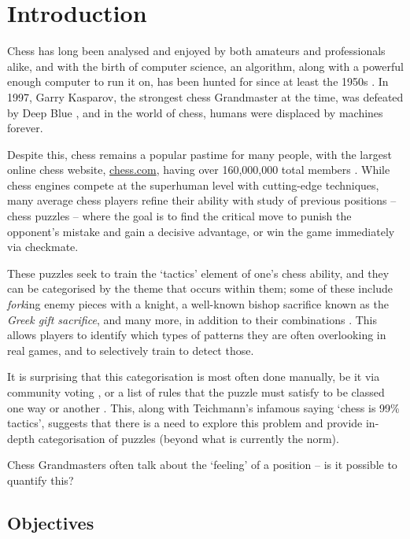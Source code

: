 \chapter{Introduction}

Chess has long been analysed and enjoyed by both amateurs and professionals
alike, and with the birth of computer science, an algorithm, along with a
powerful enough computer to run it on, has been hunted for since at least the
1950s \citep{shannon}. In 1997, Garry Kasparov, the strongest chess Grandmaster
at the time, was defeated by Deep Blue \citep{deepBlue}, and in the world of
chess, humans were displaced by machines forever. 

Despite this, chess remains a popular pastime for many people, with the largest
online chess website, \url{chess.com}, having over 160,000,000 total members
\citep{chesscomMembers}. While chess engines compete at the superhuman level
with cutting-edge techniques, many average chess players refine their ability
with study of previous positions -- chess puzzles -- where the goal is to find
the critical move to punish the opponent's mistake and gain a decisive
advantage, or win the game immediately via checkmate. 

These puzzles seek to train the `tactics' element of one's chess ability, and
they can be categorised by the theme that occurs within them; some of these
include \emph{fork}ing enemy pieces with a knight, a well-known bishop
sacrifice known as the \emph{Greek gift sacrifice}, and many more, in addition
to their combinations \citep{chessPatterns}. This allows players to identify
which types of patterns they are often overlooking in real games, and to
selectively train to detect those. 

It is surprising that this categorisation is most often done manually, be it
via community voting \citep{lichessPuzzles}, or a list of rules that the puzzle
must satisfy to be classed one way or another \citep{lichessTagger}. This,
along with Teichmann's infamous saying `chess is 99\% tactics', suggests that
there is a need to explore this problem and provide in-depth categorisation of
puzzles (beyond what is currently the norm).

Chess Grandmasters often talk about the `feeling' of a position -- is it
possible to quantify this?

\section{Objectives}

